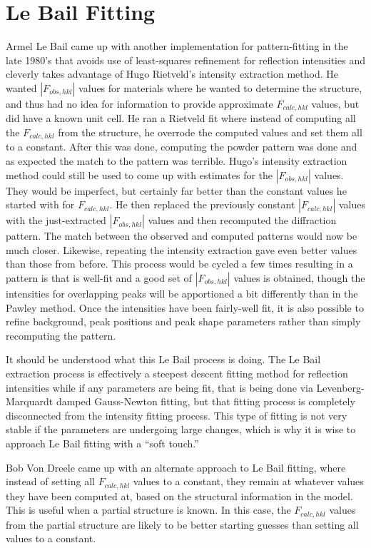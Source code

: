 \section{Le Bail Fitting}\label{ref:LeBail}
Armel Le Bail came up with another implementation for pattern-fitting in the late 1980's that avoids use of least-squares refinement for reflection intensities and cleverly takes advantage of Hugo Rietveld's intensity extraction method. He wanted $|F_{obs, hkl}|$ values for materials where he wanted to determine the structure, and thus had no idea for information to provide approximate $F_{calc, hkl}$ values, but did have a known unit cell. He ran a Rietveld fit where instead of computing all the $F_{calc, hkl}$ from the structure, he overrode the computed values and set them all to a constant. After this was done, computing the powder pattern was done and as expected the match to the pattern was terrible. Hugo's intensity extraction method could still be used to come up with estimates for the $|F_{obs, hkl}|$ values. They would be imperfect, but certainly far better than the constant values he started with for $F_{calc, hkl}$. He then replaced the previously constant $|F_{calc, hkl}|$ values with the just-extracted $|F_{obs, hkl}|$ values and then recomputed the diffraction pattern. The match between the observed and computed patterns would now be much closer. Likewise, repeating the intensity extraction gave even better values than those from before. This process would be cycled a few times resulting in a pattern is that is well-fit and a good set of $|F_{obs, hkl}|$ values is obtained, though the intensities for overlapping peaks will be apportioned a bit differently than in the Pawley method. Once the intensities have been fairly-well fit, it is also possible to refine background, peak positions and peak shape parameters rather than simply recomputing the pattern. 

It should be understood what this Le Bail process is doing. The Le Bail extraction process is effectively a steepest descent fitting method for reflection intensities while if any parameters are being fit, that is being done via Levenberg-Marquardt damped Gauss-Newton fitting, but that fitting process is completely disconnected from the intensity fitting process. This type of fitting is not very stable if the parameters are undergoing large changes, which is why it is wise to approach Le Bail fitting with a ``soft touch.''

Bob Von Dreele came up with an alternate approach to Le Bail fitting, where instead of setting all $F_{calc, hkl}$ values to a constant, they remain at whatever values they have been computed at, based on the structural information in the model. This is useful when a partial structure is known. In this case, the $F_{calc, hkl}$ values from the partial structure are likely to be better starting guesses than setting all values to a constant. 

